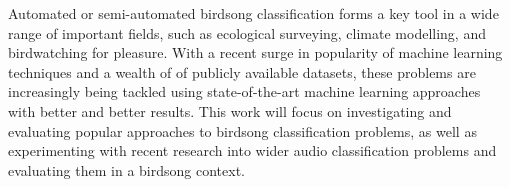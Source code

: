 Automated or semi-automated birdsong classification forms a key tool in a wide
range of important fields, such as ecological surveying, climate modelling, and
birdwatching for pleasure. With a recent surge in popularity of machine learning
techniques and a wealth of of publicly available datasets, these problems are
increasingly being tackled using state-of-the-art machine learning approaches
with better and better results. This work will focus on investigating and
evaluating popular approaches to birdsong classification problems, as well as
experimenting with recent research into wider audio classification problems and
evaluating them in a birdsong context.
